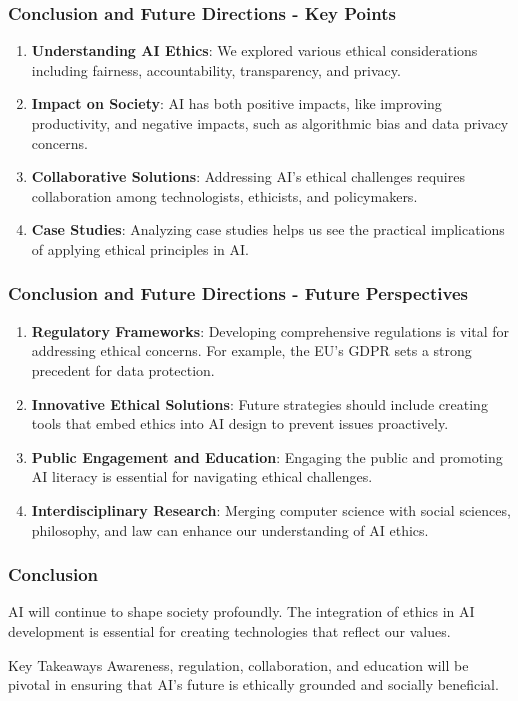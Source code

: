 \documentclass[aspectratio=169]{beamer}
\begin{document}
\begin{frame}[fragile]
  \frametitle{Conclusion and Future Directions - Key Points}
  \begin{enumerate}
    \item \textbf{Understanding AI Ethics}: We explored various ethical considerations including fairness, accountability, transparency, and privacy. 
    \item \textbf{Impact on Society}: AI has both positive impacts, like improving productivity, and negative impacts, such as algorithmic bias and data privacy concerns.
    \item \textbf{Collaborative Solutions}: Addressing AI's ethical challenges requires collaboration among technologists, ethicists, and policymakers.
    \item \textbf{Case Studies}: Analyzing case studies helps us see the practical implications of applying ethical principles in AI.
  \end{enumerate}
\end{frame}

\begin{frame}[fragile]
  \frametitle{Conclusion and Future Directions - Future Perspectives}
  \begin{enumerate}
    \item \textbf{Regulatory Frameworks}: Developing comprehensive regulations is vital for addressing ethical concerns. For example, the EU's GDPR sets a strong precedent for data protection.
    \item \textbf{Innovative Ethical Solutions}: Future strategies should include creating tools that embed ethics into AI design to prevent issues proactively.
    \item \textbf{Public Engagement and Education}: Engaging the public and promoting AI literacy is essential for navigating ethical challenges.
    \item \textbf{Interdisciplinary Research}: Merging computer science with social sciences, philosophy, and law can enhance our understanding of AI ethics.
  \end{enumerate}
\end{frame}

\begin{frame}[fragile]
  \frametitle{Conclusion}
  AI will continue to shape society profoundly. The integration of ethics in AI development is essential for creating technologies that reflect our values.
  
  \begin{block}{Key Takeaways}
    Awareness, regulation, collaboration, and education will be pivotal in ensuring that AI's future is ethically grounded and socially beneficial.
  \end{block}
\end{frame}
\end{document}
